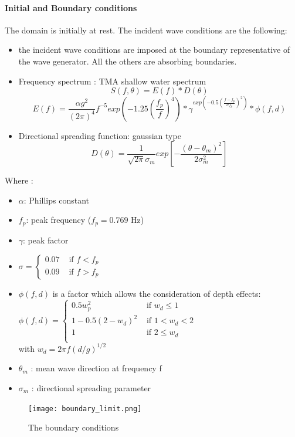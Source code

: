 \paragraph{Initial and Boundary conditions}
The domain is initially at rest.
The incident wave conditions are the following:
\begin{itemize}
\item the incident wave conditions are imposed at the boundary representative of the wave generator. All the others are absorbing boundaries.
\item Frequency spectrum : TMA shallow water spectrum
\[S(f,\theta) = E(f)*D(\theta) \]
\[E(f) = \frac{\alpha g^2}{(2\pi)^4}f^{-5} exp(-1.25(\frac{f_p}{f})^{4})*\gamma^{exp(-0.5(\frac{f-f_p}{\sigma f_p})^{2})}*\phi (f,d)
\]
\item Directional spreading function: gaussian type
\[D(\theta) = \frac{1}{\sqrt{2\pi}\sigma _m}exp[-\frac{(\theta - \theta _m)^2}{2\sigma^2_m}]
\]
\end{itemize}
Where :\\
\begin{itemize}
\item $\alpha$: Phillips constant
\item $f_p$: peak frequency ($f_p = 0.769$ Hz)
\item $\gamma $: peak factor
\item $\sigma = \left\{ \begin{array}{rl}
 0.07 &\mbox{ if $f<f_p$} \\
  0.09 &\mbox{ if $f>f_p$}
       \end{array} \right.$
\item $\phi (f,d)$ is a factor which allows the consideration of depth effects:\\
$\phi (f,d) = \left\{ \begin{array}{rl}
 0.5 w^2_p &\mbox{ if $w_d\le 1$} \\
  1-0.5(2-w_d)^2 &\mbox{ if $1<w_d<2$}\\
  1 &\mbox{ if $2 \le w_d$} \\
       \end{array} \right.$\\
       with $w_d = 2\pi f(d/g)^{1/2}$
       \item$\theta _m$ : mean wave direction at frequency f
       \item $\sigma _m$ : directional spreading parameter
\end{itemize}
\begin{figure}[h!]
  \centering
    \texttt{[image: boundary\_limit.png]}
      \caption{The boundary conditions}
\end{figure}

